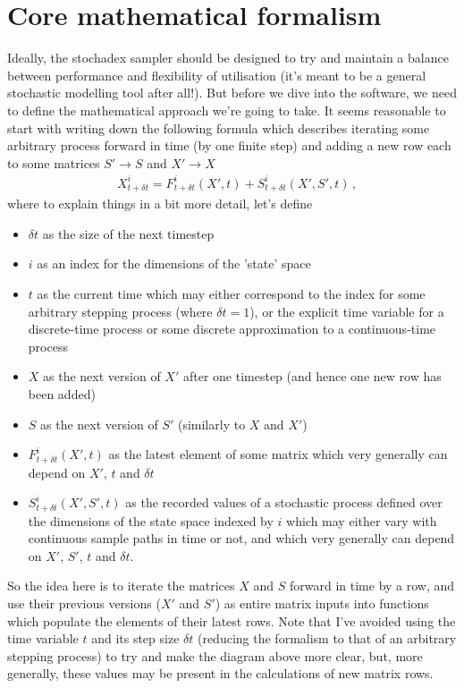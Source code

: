 \documentclass[sts]{imsart}
\begin{document}
\vspace*{1cm}
\section*{Core mathematical formalism}

Ideally, the stochadex sampler should be designed to try and maintain a balance between performance and flexibility of utilisation (it's meant to be a general stochastic modelling tool after all!). But before we dive into the software, we need to define the mathematical approach we're going to take. It seems reasonable to start with writing down the following formula which describes iterating some arbitrary process forward in time (by one finite step) and adding a new row each to some matrices $S' \rightarrow S$ and $X' \rightarrow X$
\begin{align}
& X^i_{t+\delta t} = F^i_{t+\delta t}(X',t) + S^i_{t+\delta t}(X',S',t)\,,
\end{align}
where to explain things in a bit more detail, let's define

\begin{itemize}
\item[]{$\delta t$ as the size of the next timestep}
\item[]{$i$ as an index for the dimensions of the 'state' space}
\item[]{$t$ as the current time which may either correspond to the index for some arbitrary stepping process (where $\delta t = 1$), or the explicit time variable for a discrete-time process or some discrete approximation to a continuous-time process}
\item[]{$X$ as the next version of $X'$ after one timestep (and hence one new row has been added)}
\item[]{$S$ as the next version of $S'$ (similarly to $X$ and $X'$)}
\item[]{$F^i_{t+\delta t}(X', t)$ as the latest element of some matrix which very generally can depend on $X'$, $t$ and $\delta t$}
\item[]{$S^i_{t+\delta t}(X', S', t)$ as the recorded values of a stochastic process defined over the dimensions of the state space indexed by $i$ which may either vary with continuous sample paths in time or not, and which very generally can depend on $X'$, $S'$, $t$ and $\delta t$.}
\end{itemize}

So the idea here is to iterate the matrices $X$ and $S$ forward in time by a row, and use their previous versions ($X'$ and $S'$) as entire matrix inputs into functions which populate the elements of their latest rows. Note that I've avoided using the time variable $t$ and its step size $\delta t$ (reducing the formalism to that of an arbitrary stepping process) to try and make the diagram above more clear, but, more generally, these values may be present in the calculations of new matrix rows.
\end{document}
